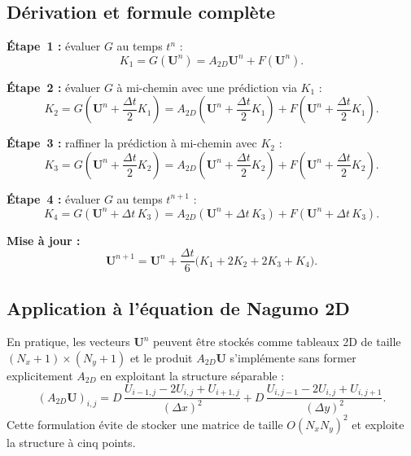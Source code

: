 \documentclass[11pt,a4paper]{report}
\begin{document}
\subsection*{D\'erivation et formule compl\`ete}

\textbf{\'Etape~1 :} \'evaluer $G$ au temps $t^n$ :
\begin{equation}
  K_1 = G(\mathbf{U}^n) = A_{2D}\mathbf{U}^n + F(\mathbf{U}^n).
\end{equation}

\textbf{\'Etape~2 :} \'evaluer $G$ \`a mi-chemin avec une pr\'ediction via $K_1$ :
\begin{equation}
  K_2 = G\!\left(\mathbf{U}^n + \frac{\Delta t}{2}K_1\right)
       = A_{2D}\!\left(\mathbf{U}^n + \frac{\Delta t}{2}K_1\right)
         + F\!\left(\mathbf{U}^n + \frac{\Delta t}{2}K_1\right).
\end{equation}

\textbf{\'Etape~3 :} raffiner la pr\'ediction \`a mi-chemin avec $K_2$ :
\begin{equation}
  K_3 = G\!\left(\mathbf{U}^n + \frac{\Delta t}{2}K_2\right)
       = A_{2D}\!\left(\mathbf{U}^n + \frac{\Delta t}{2}K_2\right)
         + F\!\left(\mathbf{U}^n + \frac{\Delta t}{2}K_2\right).
\end{equation}

\textbf{\'Etape~4 :} \'evaluer $G$ au temps $t^{n+1}$ :
\begin{equation}
  K_4 = G\!\left(\mathbf{U}^n + \Delta t\, K_3\right)
       = A_{2D}\!\left(\mathbf{U}^n + \Delta t\, K_3\right)
         + F\!\left(\mathbf{U}^n + \Delta t\, K_3\right).
\end{equation}

\textbf{Mise \`a jour :}
\begin{equation}
  \boxed{\mathbf{U}^{n+1} = \mathbf{U}^n
    + \frac{\Delta t}{6}\bigl(K_1 + 2K_2 + 2K_3 + K_4\bigr).}
\end{equation}

\subsection*{Application \`a l'\'equation de Nagumo 2D}

En pratique, les vecteurs $\mathbf{U}^n$ peuvent \^etre stock\'es comme tableaux 2D
de taille $(N_x+1)\times(N_y+1)$ et le produit $A_{2D}\mathbf{U}$ s'impl\'emente
sans former explicitement $A_{2D}$ en exploitant la structure s\'eparable :
\begin{equation}
  (A_{2D}\mathbf{U})_{i,j} = D\,\frac{U_{i-1,j}-2U_{i,j}+U_{i+1,j}}{(\Delta x)^2}
  + D\,\frac{U_{i,j-1}-2U_{i,j}+U_{i,j+1}}{(\Delta y)^2}.
\end{equation}
Cette formulation \'evite de stocker une matrice de taille $O(N_xN_y)^2$ et exploite
la structure \`a cinq points.
\end{document}
